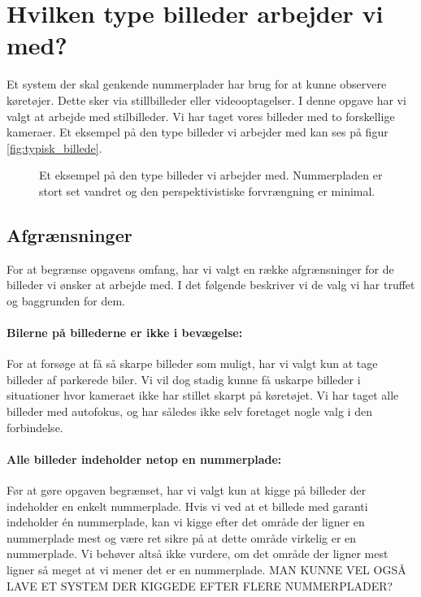 \section{Hvilken type billeder arbejder vi med?}
\label{sec:data}
Et system der skal genkende nummerplader har brug for at kunne observere køretøjer. Dette sker via stillbilleder eller videooptagelser. I denne opgave har vi valgt at arbejde med stilbilleder. Vi har taget vores billeder med to forskellige kameraer. Et eksempel på den type billeder vi arbejder med kan ses på figur \vref{fig:typisk_billede}.

\begin{figure}[htp]
\centering
{} 
\caption{Et eksempel på den type billeder vi arbejder med. Nummerpladen er stort set vandret og den perspektivistiske forvrængning er minimal.}
\label{fig:typisk_billede}
\end{figure}


\subsection{Afgrænsninger}
For at begrænse opgavens omfang, har vi valgt en række afgrænsninger for de billeder vi ønsker at arbejde med. I det følgende beskriver vi de valg vi har truffet og baggrunden for dem.

\paragraph{Bilerne på billederne er ikke i bevægelse:}
For at forsøge at få så skarpe billeder som muligt, har vi valgt kun at tage billeder af parkerede biler. Vi vil dog stadig kunne få uskarpe billeder i situationer hvor kameraet ikke har stillet skarpt på køretøjet. Vi har taget alle billeder med autofokus, og har således ikke selv foretaget nogle valg i den forbindelse.

\paragraph{Alle billeder indeholder netop en nummerplade:}
Før at gøre opgaven begrænset, har vi valgt kun at kigge på billeder der indeholder en enkelt nummerplade. Hvis vi ved at et billede med garanti indeholder én nummerplade, kan vi kigge efter det område der ligner en nummerplade mest og være ret sikre på at dette område virkelig er en nummerplade. Vi behøver altså ikke vurdere, om det område der ligner mest ligner så meget at vi mener det er en nummerplade. MAN KUNNE VEL OGSÅ LAVE ET SYSTEM DER KIGGEDE EFTER FLERE NUMMERPLADER?

